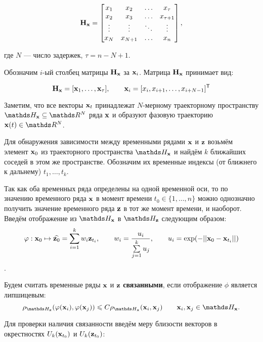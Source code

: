 \documentclass[a4paper, 12pt]{article}
\begin{document}
\begin{equation*} \label{eq:traj_mat}
	\mathbf{H}_{\mathbf{x}} = \begin{bmatrix}
		x_1 & x_2 & \ldots & x_{\tau} \\
		x_2 & x_3 & \ldots & x_{\tau+1} \\
		\vdots & \vdots & \ddots & \vdots \\
		x_{N} & x_{N+1} & \ldots & x_n
	\end{bmatrix}, 
\end{equation*} 

где $N$ --- число задержек, $\tau = n - N + 1$.

Обозначим $i\text{-ый}$ столбец матрицы $\mathbf{H}_{\mathbf{x}}$ за $\mathbf{x}_i$. 
Матрица $\mathbf{H}_{\mathbf{x}}$ принимает вид:

\begin{equation*} \label{eq:traj_mat_short}
	\mathbf{H}_{\mathbf{x}} = [\mathbf{x}_1, \ldots, \mathbf{x}_{\tau}], \qquad \mathbf{x}_i = [x_i, x_{i+1}, \ldots, x_{i+N-1}]^{\mathsf{T}} 
\end{equation*}

Заметим, что все векторы $\mathbf{x}_t$ принадлежат $N\text{-мерному}$ траекторному пространству $\dH_{\bx} \subseteq \dR^N$ ряда $\mathbf{x}$ и образуют фазовую траекторию $\bx(t) \in \dR^N$.

Для обнаружения зависимости между временными рядами $\mathbf{x}$ и $\mathbf{z}$ возьмём элемент $\mathbf{x}_0$ из траекторного пространства $\dH_{\bx}$ и найдём $k$ ближайших соседей в этом же пространстве. Обозначим их временные индексы (от ближнего к дальнему) $t_1, \ldots, t_k$.

Так как оба временных ряда определены на одной временной оси, то по значению временного ряда $\mathbf{x}$ в момент времени $t_0 \in \{ 1, \ldots, n\}$ можно однозначно получить значение временного ряда $\mathbf{z}$ в тот же момент времени, и наоборот. Введём отображение из $\dH_{\bx}$ в $\dH_{\bz}$ следующим образом: 
$$ \varphi: \mathbf{x}_0 \mapsto \widehat{\mathbf{z}_0} = \sum\limits_{i=1}^k w_i \mathbf{z}_{t_i}, \qquad 
w_i = \dfrac{u_i}{\sum\limits_{j=1}^k u_j}, \qquad
u_i = \exp(-||\mathbf{x}_0 - \mathbf{x}_{t_i}||)$$.

\begin{definition}
	Будем считать временные ряды $\mathbf{x}$ и $\mathbf{z}$ \textbf{связанными}, если отображение $\phi$ является липшицевым:
	$$ \rho_{\dH_{\bz}}(\phi(\bx_i), \phi(\bx_j)) \leq C \rho_{\dH_{\bx}}(\bx_i, \bx_j) \qquad \bx_i, \bx_j \in \dH_{\bx}. $$
\end{definition}

Для проверки наличия связанности введём меру близости векторов в окрестностях $U_k(\mathbf{x}_{t_0})$ и $U_k(\mathbf{z}_{t_0})$:
\end{document}
